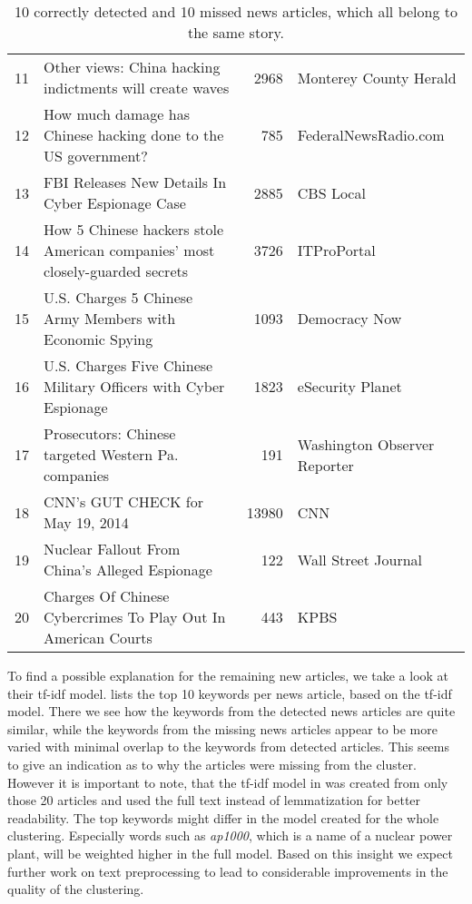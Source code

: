 \begin{table}[h]
{\begin{tabular}{rlrl}
            \hline
                11 & Other views: China hacking indictments will create waves                     &          2968 & Monterey County Herald       \\
                12 & How much damage has Chinese hacking done to the US government?               &           785 & FederalNewsRadio.com         \\
                13 & FBI Releases New Details In Cyber Espionage Case                             &          2885 & CBS Local                    \\
                14 & How 5 Chinese hackers stole American companies' most closely-guarded secrets &          3726 & ITProPortal                  \\
                15 & U.S. Charges 5 Chinese Army Members with Economic Spying                     &          1093 & Democracy Now                \\
                16 & U.S. Charges Five Chinese Military Officers with Cyber Espionage             &          1823 & eSecurity Planet             \\
                17 & Prosecutors: Chinese targeted Western Pa. companies                          &           191 & Washington Observer Reporter \\
                18 & CNN's GUT CHECK for May 19, 2014                                             &         13980 & CNN                  \\
                19 & Nuclear Fallout From China's Alleged Espionage                               &           122 & Wall Street Journal \\
                20 & Charges Of Chinese Cybercrimes To Play Out In American Courts                &           443 & KPBS               \\
                \hline
        \end{tabular}
    }
    \caption{10 correctly detected and 10 missed news articles, which all belong to the same story.}
    \label{tab:clustering_example}
\end{table}

To find a possible explanation for the remaining new articles, we take a look at their tf-idf model.
 lists the top 10 keywords per news article, based on the tf-idf model.
There we see how the keywords from the detected news articles are quite similar,
while the keywords from the missing news articles appear to be more varied with minimal overlap to the keywords from detected articles.
This seems to give an indication as to why the articles were missing from the cluster.
However it is important to note, that the tf-idf model in  was created from only those 20 articles
and used the full text instead of lemmatization for better readability.
The top keywords might differ in the model created for the whole clustering.
Especially words such as \textit{ap1000}, which is a name of a nuclear power plant, will be weighted higher in the full model.
Based on this insight we expect further work on text preprocessing to lead to considerable improvements in the quality of the clustering.

